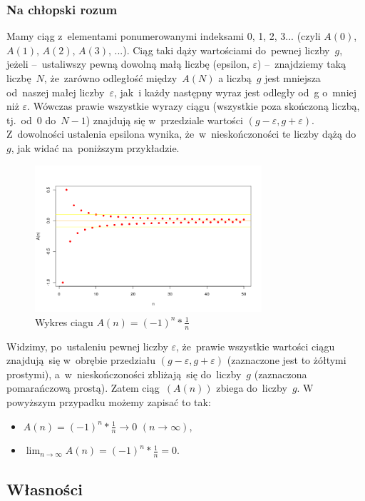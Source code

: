 \subsubsection{Na chłopski rozum}
Mamy ciąg z~elementami ponumerowanymi indeksami 0, 1, 2, 3... (czyli $A(0)$, $A(1)$, $A(2)$, $A(3)$, ...). Ciąg taki dąży wartościami do~pewnej liczby~$g$, 
jeżeli –~ustaliwszy pewną dowolną małą liczbę (epsilon, $\varepsilon$) –~znajdziemy taką liczbę~$N$, że~zarówno odległość między~$A(N)$ a liczbą~$g$ jest mniejsza od~naszej małej liczby~$\varepsilon$, 
jak~i każdy następny wyraz jest odległy od~g o~mniej niż $\varepsilon$. Wówczas prawie wszystkie wyrazy ciągu (wszystkie poza skończoną liczbą, tj.~od~$0$ do~$N-1$) znajdują się w~przedziale wartości $(g-\varepsilon, g+\varepsilon)$. 
Z~dowolności ustalenia epsilona wynika, że~w~nieskończoności te liczby dążą do~$g$, jak widać na~poniższym przykładzie.
\begin{figure}[H]
    \caption{Wykres ciagu $A(n) = (-1)^n * \frac{1}{n}$}
    \centering
        \includegraphics[width=0.75\textwidth]{photos/granica1.png}
\end{figure}
Widzimy, po~ustaleniu pewnej liczby $\varepsilon$, że~prawie wszystkie wartości ciągu znajdują~się w~obrębie przedziału $(g-\varepsilon, g+\varepsilon)$ (zaznaczone jest to żółtymi prostymi), a~w~nieskończoności zbliżają~się do~liczby~$g$ (zaznaczona pomarańczową prostą). 
Zatem ciąg~$(A(n))$ zbiega do~liczby~$g$.
W powyższym przypadku możemy zapisać to tak:
\begin{itemize}
    \item $A(n) = (-1)^n * \frac{1}{n} \to 0$ $(n \to \infty)$,
    \item $\lim_{n \to \infty} A(n) = (-1)^n * \frac{1}{n} = 0$.
\end{itemize} 

\newpage
\subsection{Własności}

